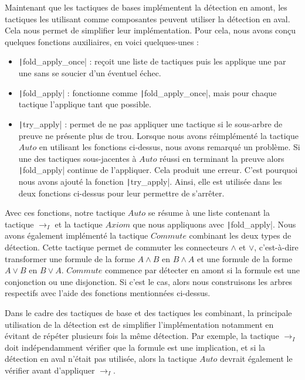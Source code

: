 \documentclass[french,titlepage]{article}
\begin{document}
Maintenant que les tactiques de bases implémentent la détection en amont, les tactiques les utilisant comme composantes peuvent utiliser la détection en aval. Cela nous permet de simplifier leur implémentation. Pour cela, nous avons conçu quelques fonctions auxiliaires, en voici quelques-unes :
\begin{itemize}
    \item \texttt|fold_apply_once| : reçoit une liste de tactiques puis les applique une par une sans se soucier d'un éventuel échec.
    \item \texttt|fold_apply| : fonctionne comme \texttt|fold_apply_once|, mais pour chaque tactique l'applique tant que possible.
    \item \texttt|try_apply| : permet de ne pas appliquer une tactique si le sous-arbre de preuve ne présente plus de trou. Lorsque nous avons réimplémenté la tactique $Auto$ en utilisant les fonctions ci-dessus, nous avons remarqué un problème. Si une des tactiques sous-jacentes à $Auto$ réussi en terminant la preuve alors \texttt|fold_apply| continue de l'appliquer. Cela produit une erreur. C'est pourquoi nous avons ajouté la fonction \texttt|try_apply|. Ainsi, elle est utilisée dans les deux fonctions ci-dessus pour leur permettre de s'arrêter.
\end{itemize}
Avec ces fonctions, notre tactique $Auto$ se résume à une liste contenant la tactique $\to_I$ et la tactique $Axiom$ que nous appliquons avec \texttt|fold_apply|. Nous avons également implémenté la tactique $Commute$ combinant les deux types de détection. Cette tactique permet de commuter les connecteurs $\land$ et $\lor$, c'est-à-dire transformer une formule de la forme $A \land B$ en $B \land A$ et une formule de la forme $A \lor B$ en $B \lor A$. $Commute$ commence par détecter en amont si la formule est une conjonction ou une disjonction. Si c'est le cas, alors nous construisons les arbres respectifs avec l'aide des fonctions mentionnées ci-dessus.

Dans le cadre des tactiques de base et des tactiques les combinant, la principale utilisation de la détection est de simplifier l'implémentation notamment en évitant de répéter plusieurs fois la même détection. Par exemple, la tactique $\to_I$ doit indépendamment vérifier que la formule est une implication, et si la détection en aval n'était pas utilisée, alors la tactique $Auto$ devrait également le vérifier avant d'appliquer $\to_I$.
\end{document}
